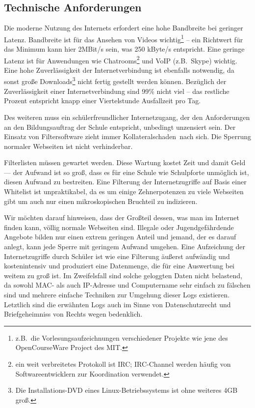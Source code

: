 \documentclass[10pt,a4paper,notitlepage]{scrartcl}
\newcommand{\gfo}{\grqq\ }
\newcommand{\gfu}{\glqq}
\begin{document}
\subsection{Technische Anforderungen}
\begin{multicols}{2}
Die moderne Nutzung des Internets erfordert eine hohe Bandbreite bei geringer Latenz. Bandbreite ist für das Ansehen von Videos wichtig\footnote{z.B.\ die Vorlesungsaufzeichnungen verschiedener Projekte wie jene des OpenCourseWare Project des MIT.}	-- ein Richtwert für  das Minimum kann hier 2MBit/s sein, was 250 kByte/s entspricht. Eine geringe Latenz ist für Anwendungen wie Chatrooms\footnote{ein weit verbreitetes Protokoll ist IRC; IRC-Channel werden häufig von Softwareentwicklern zur Koordination verwendet.} und VoIP (z.B.\ Skype) wichtig. Eine hohe Zuverlässigkeit der Internetverbindung ist ebenfalls notwendig, da sonst große Downloads\footnote{Die Installations-DVD eines Linux-Betriebssystems ist ohne weiteres 4GB groß.} nicht fertig gestellt werden können. Bezüglich der Zuverlässigkeit einer Internetverbindung sind 99\% nicht viel -- das restliche Prozent entspricht knapp einer Viertelstunde Ausfallzeit pro Tag.

Des weiteren muss ein schülerfreundlicher Internetzugang, der den Anforderungen an den Bildungsauftrag der Schule entspricht, unbedingt unzensiert sein. Der Einsatz von Filtersoftware zieht immer \gfu Kollateralschaden\gfo nach sich. Die Sperrung normaler Webseiten ist nicht verhinderbar.

Filterlisten müssen gewartet werden. Diese Wartung kostet Zeit und damit Geld --- der Aufwand ist so groß, dass es für eine Schule wie Schulpforte unmöglich ist, diesen Aufwand zu bestreiten. Eine Filterung der Internetzugriffe auf Basis einer Whitelist ist unpraktikabel, da es um einige Zehnerpotenzen zu viele Webseiten gibt um auch nur einen mikroskopischen Bruchteil zu indizieren.

Wir möchten darauf hinweisen, dass der Großteil dessen, was man im Internet finden kann, völlig normale Webseiten sind. Illegale oder Jugendgefährdende Angebote bilden nur einen extrem geringen Anteil und jemand, der es darauf anlegt, kann jede Sperre mit geringem Aufwand umgehen. Eine Aufzeichung der Internetzugriffe durch Schüler ist wie eine Filterung äußerst aufwändig und kostenintensiv und produziert eine Datenmenge, die für eine Auswertung bei weitem zu groß ist. Im Zweifelsfall sind solche geloggten Daten nicht belastend, da sowohl MAC- als auch IP-Adresse und Computername sehr einfach zu fälschen sind und mehrere einfache Techniken zur Umgehung dieser Logs existieren. Letztlich sind die erwähnten Logs auch im Sinne von Datenschutzrecht und Briefgeheimniss von Rechts wegen bedenklich.


\end{multicols}
\end{document}
